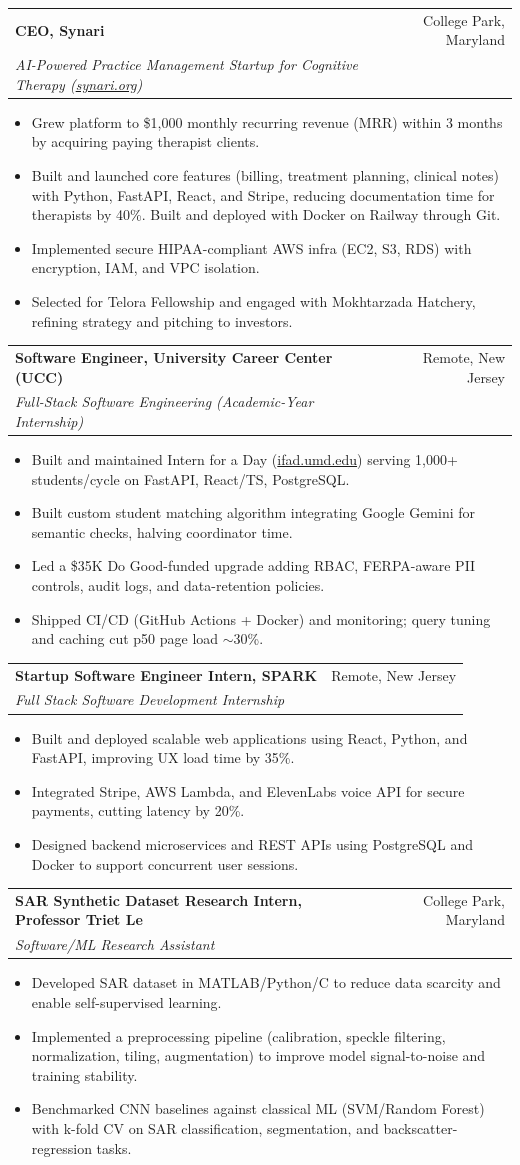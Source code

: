 \documentclass[letterpaper,10pt]{article}
\makeatletter
\newcommand{\resumeItem}[1]{
  \item\small{
    {#1 \vspace{-2pt}}
  }
}
\newcommand{\resumeSubheading}[4]{
  \vspace{-2pt}\item
    \begin{tabular*}{0.97\textwidth}[t]{l@{\extracolsep{\fill}}r}
      \textbf{#1} & #2 \\
      \textit{\small#3} & \textit{\small #4} \\
    \end{tabular*}\vspace{-7pt}
}
\newcommand{\resumeItemListStart}{\begin{itemize}}
\newcommand{\resumeItemListEnd}{\end{itemize}\vspace{-5pt}}
\makeatother
\begin{document}
    \resumeSubheading
      {CEO, Synari}{College Park, Maryland}
      {AI-Powered Practice Management Startup for Cognitive Therapy (\href{https://synari.org}{synari.org})}{}
      \resumeItemListStart
        \resumeItem{Grew platform to \$1,000 monthly recurring revenue (MRR) within 3 months by acquiring paying therapist clients.}
        \resumeItem{Built and launched core features (billing, treatment planning, clinical notes) with Python, FastAPI, React, and Stripe, reducing documentation time for therapists by 40\%. Built and deployed with Docker on Railway through Git.}
        \resumeItem{Implemented secure HIPAA-compliant AWS infra (EC2, S3, RDS) with encryption, IAM, and VPC isolation.}
        \resumeItem{Selected for Telora Fellowship and engaged with Mokhtarzada Hatchery, refining strategy and pitching to investors.}
      \resumeItemListEnd

    \resumeSubheading
      {Software Engineer, University Career Center (UCC)}{Remote, New Jersey}
      {Full-Stack Software Engineering (Academic-Year Internship)}{}
      \resumeItemListStart
        \resumeItem{Built and maintained Intern for a Day (\href{https://ifad.umd.edu}{ifad.umd.edu}) serving 1,000+ students/cycle on FastAPI, React/TS, PostgreSQL.}
        \resumeItem{Built custom student matching algorithm integrating Google Gemini for semantic checks, halving coordinator time.}
        \resumeItem{Led a \$35K Do Good-funded upgrade adding RBAC, FERPA-aware PII controls, audit logs, and data-retention policies.}
        \resumeItem{Shipped CI/CD (GitHub Actions + Docker) and monitoring; query tuning and caching cut p50 page load $\sim$30\%.}
      \resumeItemListEnd

    \resumeSubheading
      {Startup Software Engineer Intern, SPARK}{Remote, New Jersey}
      {Full Stack Software Development Internship}{}
      \resumeItemListStart
        \resumeItem{Built and deployed scalable web applications using React, Python, and FastAPI, improving UX load time by 35\%.}
        \resumeItem{Integrated Stripe, AWS Lambda, and ElevenLabs voice API for secure payments, cutting latency by 20\%.}
        \resumeItem{Designed backend microservices and REST APIs using PostgreSQL and Docker to support concurrent user sessions.}
      \resumeItemListEnd

    \resumeSubheading
      {SAR Synthetic Dataset Research Intern, Professor Triet Le}{College Park, Maryland}
      {Software/ML Research Assistant}{}
      \resumeItemListStart
        \resumeItem{Developed SAR dataset in MATLAB/Python/C to reduce data scarcity and enable self-supervised learning.}
        \resumeItem{Implemented a preprocessing pipeline (calibration, speckle filtering, normalization, tiling, augmentation) to improve model signal-to-noise and training stability.}
        \resumeItem{Benchmarked CNN baselines against classical ML (SVM/Random Forest) with k-fold CV on SAR classification, segmentation, and backscatter-regression tasks.}
      \resumeItemListEnd
\end{document}
